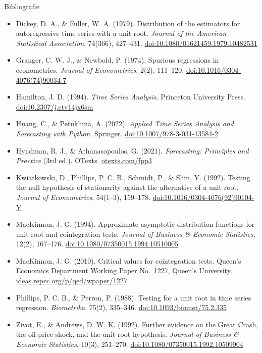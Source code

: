 \begin{frame}{Bibliografie}
\itemsize{\tiny}
\begin{itemize}
    \item Dickey, D. A., \& Fuller, W. A. (1979). Distribution of the estimators for autoregressive time series with a unit root. \textit{Journal of the American Statistical Association}, 74(366), 427--431. \href{https://doi.org/10.1080/01621459.1979.10482531}{doi:10.1080/01621459.1979.10482531}
    \item Granger, C. W. J., \& Newbold, P. (1974). Spurious regressions in econometrics. \textit{Journal of Econometrics}, 2(2), 111--120. \href{https://doi.org/10.1016/0304-4076(74)90034-7}{doi:10.1016/0304-4076(74)90034-7}
    \item Hamilton, J. D. (1994). \textit{Time Series Analysis}. Princeton University Press. \href{https://doi.org/10.2307/j.ctv14jx6sm}{doi:10.2307/j.ctv14jx6sm}
    \item Huang, C., \& Petukhina, A. (2022). \textit{Applied Time Series Analysis and Forecasting with Python}. Springer. \href{https://doi.org/10.1007/978-3-031-13584-2}{doi:10.1007/978-3-031-13584-2}
    \item Hyndman, R. J., \& Athanasopoulos, G. (2021). \textit{Forecasting: Principles and Practice} (3rd ed.). OTexts. \href{https://otexts.com/fpp3/}{otexts.com/fpp3}
    \item Kwiatkowski, D., Phillips, P. C. B., Schmidt, P., \& Shin, Y. (1992). Testing the null hypothesis of stationarity against the alternative of a unit root. \textit{Journal of Econometrics}, 54(1--3), 159--178. \href{https://doi.org/10.1016/0304-4076(92)90104-Y}{doi:10.1016/0304-4076(92)90104-Y}
    \item MacKinnon, J. G. (1994). Approximate asymptotic distribution functions for unit-root and cointegration tests. \textit{Journal of Business \& Economic Statistics}, 12(2), 167--176. \href{https://doi.org/10.1080/07350015.1994.10510005}{doi:10.1080/07350015.1994.10510005}
    \item MacKinnon, J. G. (2010). Critical values for cointegration tests. Queen's Economics Department Working Paper No.~1227, Queen's University. \href{https://ideas.repec.org/p/qed/wpaper/1227.html}{ideas.repec.org/p/qed/wpaper/1227}
    \item Phillips, P. C. B., \& Perron, P. (1988). Testing for a unit root in time series regression. \textit{Biometrika}, 75(2), 335--346. \href{https://doi.org/10.1093/biomet/75.2.335}{doi:10.1093/biomet/75.2.335}
    \item Zivot, E., \& Andrews, D. W. K. (1992). Further evidence on the Great Crash, the oil-price shock, and the unit-root hypothesis. \textit{Journal of Business \& Economic Statistics}, 10(3), 251--270. \href{https://doi.org/10.1080/07350015.1992.10509904}{doi:10.1080/07350015.1992.10509904}
\end{itemize}
\end{frame}


